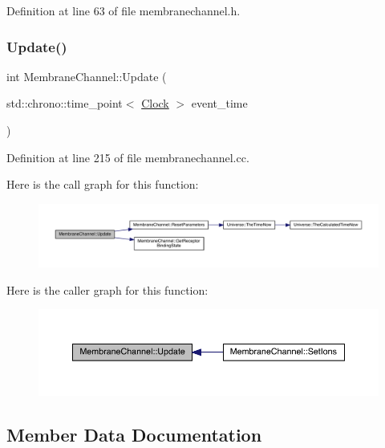 Definition at line 63 of file membranechannel.\+h.

\mbox{\label{class_membrane_channel_a34077828eee1c2457212f05217b09d6c}} 
\subsubsection{\texorpdfstring{Update()}{Update()}}
{\footnotesize\ttfamily int Membrane\+Channel\+::\+Update (\begin{DoxyParamCaption}\item[{std\+::chrono\+::time\+\_\+point$<$ \hyperlink{universe_8h_a0ef8d951d1ca5ab3cfaf7ab4c7a6fd80}{Clock} $>$}]{event\+\_\+time }\end{DoxyParamCaption})}



Definition at line 215 of file membranechannel.\+cc.

Here is the call graph for this function\+:
\nopagebreak
\begin{figure}[H]
\begin{center}
\leavevmode
\includegraphics[width=350pt]{class_membrane_channel_a34077828eee1c2457212f05217b09d6c_cgraph}
\end{center}
\end{figure}
Here is the caller graph for this function\+:
\nopagebreak
\begin{figure}[H]
\begin{center}
\leavevmode
\includegraphics[width=350pt]{class_membrane_channel_a34077828eee1c2457212f05217b09d6c_icgraph}
\end{center}
\end{figure}


\subsection{Member Data Documentation}
\mbox{\label{class_membrane_channel_ad603f58813157b33ca81b919cf9c2897}} 
